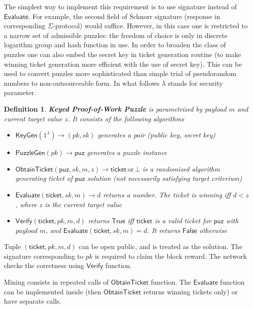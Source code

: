 \documentclass[]{article}
\newcommand{\Ticket}{\mathsf{ticket}}
\newcommand{\KeyGen}{\mathsf{KeyGen}}
\newcommand{\PuzzleGen}{\mathsf{PuzzleGen}}
\newcommand{\Eval}{\mathsf{Evaluate}}
\newcommand{\Verify}{\mathsf{Verify}}
\newcommand{\ObtainTicket}{\mathsf{ObtainTicket}}
\newtheorem{definition}{Definition}
\begin{document}
    The simplest way to implement this requirement is to use signature instead
    of $\Eval$. For example, the second field of Schnorr signature (response in
    corresponding $\Sigma$-protocol) would suffice. However, in this case one is
    restricted to a narrow set of admissible puzzles: the freedom of choice is
    only in discrete logarithm group and hash function in use. In order to
    broaden the class of puzzles one can also embed the secret key in ticket
    generation routine (to make winning ticket generation more efficient with
    the use of secret key). This can be used to convert puzzles more sophisticated
    than simple trial of pseudorandom numbers to non-outsourceable form. In what
    follows $\lambda$ stands for security parameter.
    \begin{definition}
        {\bf Keyed Proof-of-Work Puzzle} is parametrized by payload $m$ and
        current target value $z$. It consists of the following algorithms
        \begin{itemize}
            \item $\KeyGen(1^\lambda)\rightarrow (pk,sk)$ generates a pair (public key,
                secret key)
            \item $\PuzzleGen(pk)\rightarrow \mathsf{puz}$ generates a puzzle instance
            \item
                $\ObtainTicket(\mathsf{puz},sk,m,z)\rightarrow\Ticket \,
                \mathrm{or}\,\bot$
                is a randomized algorithm generating ticket of 
                $\mathsf{puz}$ solution (not necessarily satisfying target
                criterium)
            \item $\Eval(\Ticket,sk,m)\rightarrow d$
                returns a number. The ticket is winning iff $d<z$, where $z$
                is the current target value
            \item $\Verify(\Ticket,pk,m,d)$ returns $\mathsf{True}$ iff
                $\Ticket$ is a valid ticket for $\mathsf{puz}$ with payload $m$,
                and $\Eval(\Ticket,sk,m)=d$. It returns $\mathsf{False}$
                otherwise
        \end{itemize}
    \end{definition}
    Tuple $(\Ticket, pk, m, d)$ can be open public, and is treated as the
    solution. The signature corresponding to $pk$ is required to claim the block
    reward. The network checks the corretness using $\Verify$ function.

    Mining consists in repeated calls of $\ObtainTicket$ function.
    The $\Eval$ function can be implemented inside (then $\ObtainTicket$
    returns winning tickets only) or have separate calls.
\end{document}
